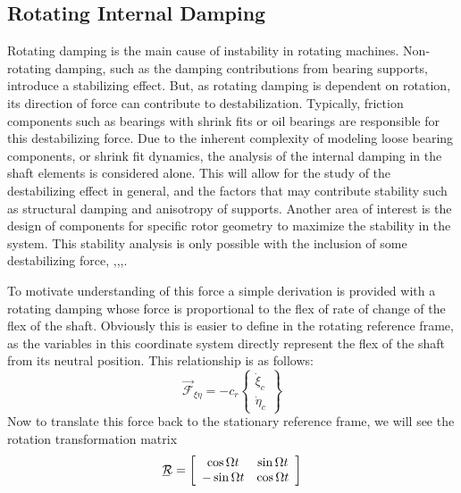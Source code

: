 \subsection{Rotating Internal Damping} \label{Rotating Internal Damping}
Rotating damping is the main cause of instability in rotating machines. Non-rotating damping, such as the damping contributions from bearing supports, introduce a stabilizing effect. But, as rotating damping is dependent on rotation, its direction of force can contribute to destabilization. Typically, friction components such as bearings with shrink fits or oil bearings are responsible for this destabilizing force. Due to the inherent complexity of modeling loose bearing components, or shrink fit dynamics, the analysis of the internal damping in the shaft elements is considered alone. This will allow for the study of the destabilizing effect in general, and the factors that may contribute stability such as structural damping and anisotropy of supports. Another area of interest is the design of components for specific rotor geometry to maximize the stability in the system. This stability analysis is only possible with the inclusion of some destabilizing force, \cite{genta2007dynamics},\cite{genta2004persistent},\cite{kandil2005rotor},\cite{zorzi1977finite}.\par 
To motivate understanding of this force a simple derivation is provided with a rotating damping whose force is proportional to the flex of rate of change of the flex of the shaft. Obviously this is easier to define in the rotating reference frame, as the variables in this coordinate system directly represent the flex of the shaft from its neutral position. This relationship is as follows:
\begin{equation}\label{eq:LinearViscousDampingRot}
\vec{\mathcal{F}}_{\xi\eta}=-c_r
\left\{\begin{array}{c}
\dot{\xi}_c\\
\dot{\eta}_c
\end{array}\right\}
\end{equation}
Now to translate this force back to the stationary reference frame, we will see the rotation transformation matrix 
\begin{equation}\label{eq:RotationTransformation2D}
\bunderline{\mathcal{R}}=\left[\begin{array}{cc}
\cos{\Omega t}& \sin{\Omega t}\\
-\sin{\Omega t}& \cos{\Omega t}
\end{array}\right]
\end{equation}
